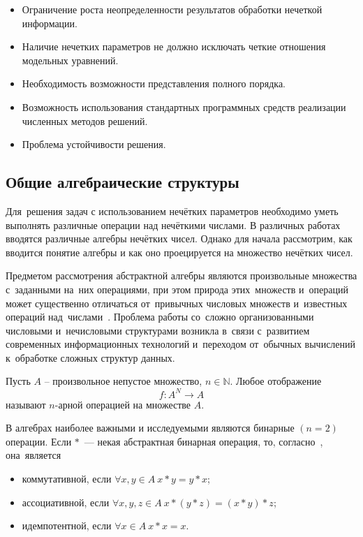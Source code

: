 \begin{itemize}
	\item Ограничение роста неопределенности результатов обработки нечеткой информации.
	\item Наличие нечетких параметров не должно исключать четкие отношения модельных уравнений.
	\item Необходимость возможности представления полного порядка.
	\item Возможность использования стандартных программных средств реализации численных методов решений.
	\item Проблема устойчивости решения.
\end{itemize}

\subsection{Общие алгебраические структуры}

Для~решения задач с использованием нечётких параметров необходимо уметь выполнять различные операции над нечёткими числами. В различных работах вводятся различные алгебры нечётких чисел. Однако для начала рассмотрим, как вводится понятие алгебры и как оно проецируется на множество нечётких чисел.

Предметом рассмотрения абстрактной алгебры являются произвольные множества с~заданными на~них операциями, при этом природа этих~множеств и~операций может существенно отличаться от~привычных числовых множеств и~известных операций над~числами~\cite{Bauman_DM}. Проблема работы со~сложно организованными числовыми и~нечисловыми структурами возникла в~связи с~развитием современных информационных технологий и~переходом от~обычных вычислений к~обработке сложных структур данных.

\begin{mydef}
Пусть $A$ – произвольное непустое множество, $n\in \mathbb{N}$. Любое отображение 
\begin{equation*}
	f:A^N \to A
\end{equation*}
называют $n$-арной операцией на множестве $A$.
\end{mydef}

В алгебрах наиболее важными и исследуемыми являются бинарные $\left( n=2 \right)$ операции. Если $*$~--- некая абстрактная бинарная операция, то, согласно~\cite{Bauman_DM}, она~является
\begin{itemize}
	\item коммутативной, если $\forall x,y\in A\ x*y=y*x$;
	\item ассоциативной, если $\forall x,y,z\in A\ x*\left( y*z \right)=\left( x*y \right)*z$;
	\item идемпотентной, если $\forall x\in A\ x*x=x$.
\end{itemize}

